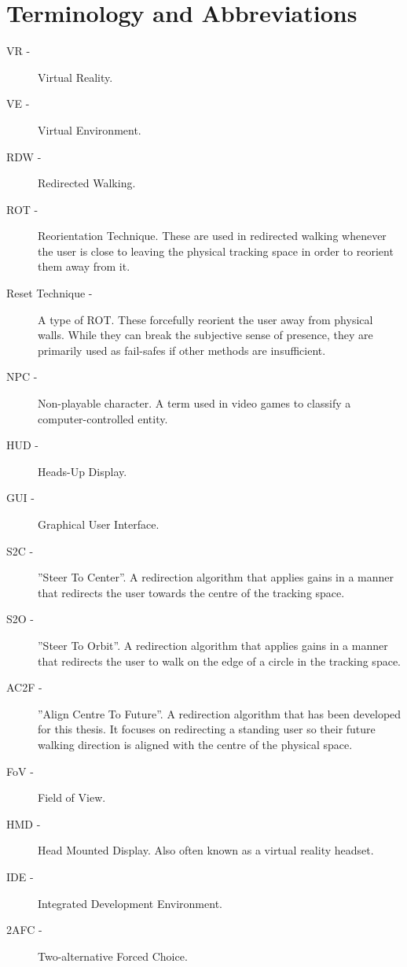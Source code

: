 \chapter{Terminology and Abbreviations}\label{app:terminology}

\begin{description}
\item[VR -] Virtual Reality.
\item[VE -] Virtual Environment.
\item[RDW -] Redirected Walking.
\item[ROT -] Reorientation Technique. These are used in redirected walking whenever the user is close to leaving the physical tracking space in order to reorient them away from it. 
\item[Reset Technique -] A type of ROT. These forcefully reorient the user away from physical walls. While they can break the subjective sense of presence, they are primarily used as fail-safes if other methods are insufficient.
\item[NPC -] Non-playable character. A term used in video games to classify a computer-controlled entity.
\item[HUD -] Heads-Up Display.
\item[GUI -] Graphical User Interface.
\item[S2C -] ''Steer To Center''. A redirection algorithm that applies gains in a manner that redirects the user towards the centre of the tracking space.
\item[S2O -] ''Steer To Orbit''. A redirection algorithm that applies gains in a manner that redirects the user to walk on the edge of a circle in the tracking space.
\item[AC2F -] ''Align Centre To Future''. A redirection algorithm that has been developed for this thesis. It focuses on redirecting a standing user so their future walking direction is aligned with the centre of the physical space.
\item[FoV -] Field of View.
\item[HMD -] Head Mounted Display. Also often known as a virtual reality headset.
\item[IDE -] Integrated Development Environment.
\item[2AFC -] Two-alternative Forced Choice.
\end{description}